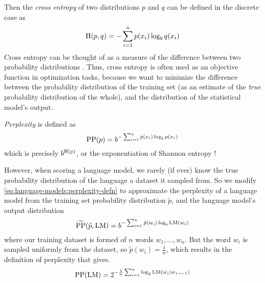 Then the \textit{cross entropy} of two distributions $p$ and $q$ can be defined in the discrete case as
\begin{equation}
    \operatorname{H}(p, q) =  - \sum_{i=1}^n p(x_i) \log_b q(x_i) \label{eq:language-models:cross-entropy}
\end{equation}
Cross entropy can be thought of as a measure of the difference between two probability distributions \cite{ManningSchuetze99}.
Thus, cross entropy is often used as an objective function in optimization tasks, because we want to minimize the difference between the probability distribution of the training set (as an estimate of the \textit{true} probability distribution of the whole), and the distribution of the statistical model's output.

\textit{Perplexity} is defined as
\begin{equation}
    \operatorname{PP}(p) = b^{- \sum_{i=1}^n p(x_i) \log_b p(x_i)} \label{eq:language-models:perplexity-defn}
\end{equation}
which is precisely $b^{\operatorname{H}(p)}$, or the exponentiation of Shannon entropy \cite{ManningSchuetze99}!

However, when scoring a language model, we rarely (if ever) know the true probability distribution of the language a dataset it sampled from.
So we modify \autoref{eq:language-models:perplexity-defn} to approximate the perplexity of a language model from the training set probability distribution $\tilde p$, and the language model's output distribution
\begin{equation}
    \widetilde{\operatorname{PP}}(\tilde p, \operatorname{LM})  = b^{- \sum_{i=1}^{n} \tilde{p}(w_i) \log_b \operatorname{LM}(w_i)}\label{eq:language-models:perplexity-p-model}
\end{equation}
where our training dataset is formed of $n$ words $w_1, \dots, w_n$.
But the word $w_i$ is sampled uniformly from the dataset, so $\tilde p(w_i) = \frac{1}{n}$, which results in the definition of perplexity that \cite{goldberg_2017} gives.
\begin{equation}
    \operatorname{PP}(\operatorname{LM}) = 2^{-\frac{1}{n}\sum_{i=1}^n \log_2 \operatorname{LM}(w_i \mid w_{1:i-1})} \label{eq:language-models:perplexity}
\end{equation}

